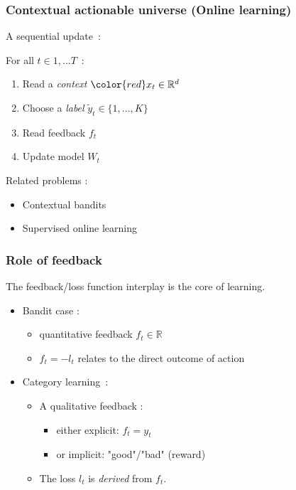 \documentclass{beamer}
\begin{document}
\begin{frame}\frametitle{Contextual actionable universe (Online learning)}
A sequential update~:
\begin{block}{}
For all $t \in 1,... T$~:
\begin{enumerate}
	\item Read a \emph{context} ${\color{red}x_t} \in \mathbb{R}^d$
	\item Choose a \emph{label} $\tilde{y}_t \in \{1,...,K\}$ %
	\item Read feedback $f_t$
	\item Update model $W_t$
\end{enumerate}
\end{block}

Related problems :
\begin{itemize}
	\item Contextual bandits \cite{lai1985asymptotically,auer2002finite}
	\item Supervised online learning \cite{rosenblatt1958perceptron,duda1973pattern}
\end{itemize}

\end{frame}

\begin{frame}\frametitle{Role of feedback}
	\begin{block}{}
		The feedback/loss function interplay is the core of learning.
	\end{block}
 \begin{itemize}
 	\item Bandit case : 
 	\begin{itemize}
 		\item quantitative feedback $f_t \in \mathbb{R}$
 		\item $f_t = -l_t$ relates to the direct outcome of action
 	\end{itemize}
 	\item Category learning~:
 	\begin{itemize}
 		\item A qualitative feedback :
 		\begin{itemize}
 			\item either explicit: $f_t = y_t$
 			\item or implicit: "good"/"bad" (reward) 
 		\end{itemize}
 		\item The loss $l_t$ is \textit{derived} from $f_t$.
 	\end{itemize}
 \end{itemize}
 
 
 
\end{frame}
\end{document}
